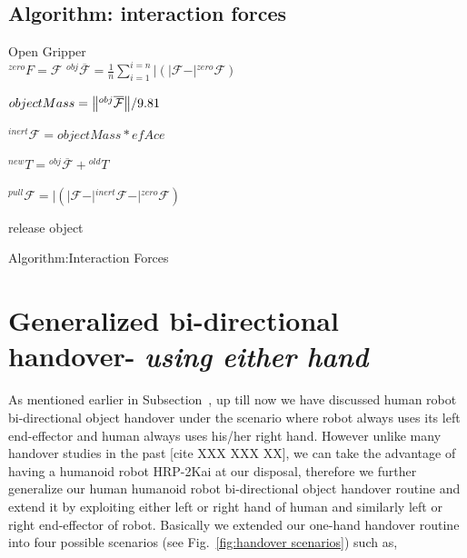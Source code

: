 \documentclass[a4paper, 12pt, oneside]{Thesis}  %
\begin{document}
\subsection{Algorithm: interaction forces}
\begin{algorithm}[H]\label{interaction forces}
	\DontPrintSemicolon
	\SetNoFillComment
	
	
	{
		{
		    Open Gripper\\
			$\mathcal{}^{zero}{F}= \mathcal{F}$
		}
		${}^{obj}\overline{\mathcal{F}} = \frac{1}{n}\sum_{i=1}^{i=n} \vert{ (\vert{\mathcal{F}} - \vert{{}^{zero}\mathcal{F}}) }$
		
		$objectMass = \norm{{}^{obj}\overline{\mathcal{F}}}/9.81 $
		
		${}^{inert}\mathcal{F} = objectMass * efAce$ 
		
		${}^{new}T = {}^{obj}\overline{\mathcal{F}} + {}^{old}T$
		
		{	
			${}^{pull}\mathcal{F} = \vert{(\vert\mathcal{{F}} - \vert{}^{inert}\mathcal{{F}} - \vert{}^{zero}\mathcal{{F}}) }$
			
			{
				\textrm{release object}
			}
		}
	}
	\caption{Algorithm:Interaction Forces}
\end{algorithm}




\clearpage

\section{Generalized bi-directional handover- \textit{using either hand}}\label{both hands individual}

As mentioned earlier in Subsection~, up till now we have discussed human robot bi-directional object handover under the scenario where robot always uses its left end-effector and human always uses his/her right hand. However unlike many handover studies in the past [cite XXX XXX XX], we can take the advantage of having a humanoid robot HRP-2Kai at our disposal, therefore we further generalize our human humanoid robot bi-directional object handover routine and extend it by exploiting either left or right hand of human and similarly left or right end-effector of robot. Basically we extended our one-hand handover routine into four possible scenarios (see Fig.~\ref{fig:handover scenarios}) such as,
\end{document}

